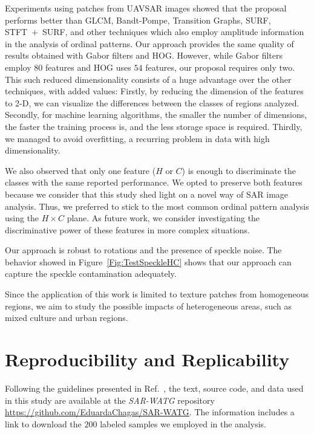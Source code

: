 \documentclass[journal]{IEEEtran}
\begin{document}
Experiments using patches from UAVSAR images showed that the proposal performs better than GLCM, Bandt-Pompe, Transition Graphs, SURF, \mbox{STFT + SURF}, and other techniques which also employ amplitude information in the analysis of ordinal patterns. 
Our approach provides the same quality of results obtained with Gabor filters and HOG.
However, while Gabor filters employ $80$ features and HOG uses $54$ features, our proposal requires only two.
This such reduced dimensionality consists of a huge advantage over the other techniques, with added values:
Firstly, by reducing the dimension of the features to \mbox{2-D}, we can visualize the differences between the classes of regions analyzed.
Secondly, for machine learning algorithms, the smaller the number of dimensions, the faster the training process is, and the less storage space is required.
Thirdly, we managed to avoid overfitting, a recurring problem in data with high dimensionality.

We also observed that only one feature ($H$ or $C$) is enough to discriminate the classes with the same reported performance. We opted to preserve both features because we consider that this study shed light on a novel way of SAR image analysis. Thus, we preferred to stick to the most common ordinal pattern analysis using the $H \times C $ plane. As future work, we consider investigating the discriminative power of these features in more complex situations.

Our approach is robust to rotations and the presence of speckle noise. The behavior showed in Figure~\ref{Fig:TestSpeckleHC} shows that our approach can capture the speckle contamination adequately.

Since the application of this work is limited to texture patches from homogeneous regions, we aim to study the possible impacts of heterogeneous areas, such as mixed culture and urban regions.

\section{Reproducibility and Replicability} 

Following the guidelines presented in Ref.~\cite{ABadgingSystemforReproducibilityandReplicabilityinRemoteSensingResearch}, the text, source code, and data used in this study are available at the \textit{SAR-WATG} repository \url{https://github.com/EduardaChagas/SAR-WATG}.
The information includes a link to download the $200$ labeled samples we employed in the analysis.
\end{document}
